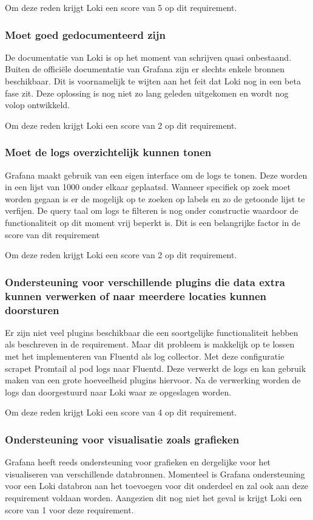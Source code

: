 Om deze reden krijgt Loki een score van 5 op dit requirement.

\subsubsection{Moet goed gedocumenteerd zijn}
De documentatie van Loki is op het moment van schrijven quasi onbestaand. Buiten de officiële documentatie van Grafana zijn er slechts enkele bronnen beschikbaar. Dit is voornamelijk te wijten aan het feit dat Loki nog in een beta fase zit. Deze oplossing is nog niet zo lang geleden uitgekomen en wordt nog volop ontwikkeld. 

Om deze reden krijgt Loki een score van 2 op dit requirement.

\subsubsection{Moet de logs overzichtelijk kunnen tonen}
Grafana maakt gebruik van een eigen interface om de logs te tonen. Deze worden in een lijst van 1000 onder elkaar geplaatsd. Wanneer specifiek op zoek moet worden gegaan is er de mogelijk op te zoeken op labels en zo de getoonde lijst te verfijen. De query taal om logs te filteren is nog onder constructie waardoor de functionaliteit op dit moment vrij beperkt is. Dit is een belangrijke factor in de score van dit requirement

Om deze reden krijgt Loki een score van 2 op dit requirement.

\subsubsection{Ondersteuning voor verschillende plugins die data extra kunnen verwerken of naar meerdere locaties kunnen doorsturen}
Er zijn niet veel plugins beschikbaar die een soortgelijke functionaliteit hebben als beschreven in de requirement. Maar dit probleem is makkelijk op te lossen met het implementeren van Fluentd als log collector. Met deze configuratie scrapet Promtail al pod logs naar Fluentd. Deze verwerkt de logs en kan gebruik maken van een grote hoeveelheid plugins hiervoor. Na de verwerking worden de logs dan doorgestuurd naar Loki waar ze opgeslagen worden.

Om deze reden krijgt Loki een score van 4 op dit requirement.

\subsubsection{Ondersteuning voor visualisatie zoals grafieken}
Grafana heeft reeds ondersteuning voor grafieken en dergelijke voor het visualiseren van verschillende databronnen. Momenteel is Grafana ondersteuning voor een Loki databron aan het toevoegen voor dit onderdeel en zal ook aan deze requirement voldaan worden. Aangezien dit nog niet het geval is krijgt Loki een score van 1 voor deze requirement.

